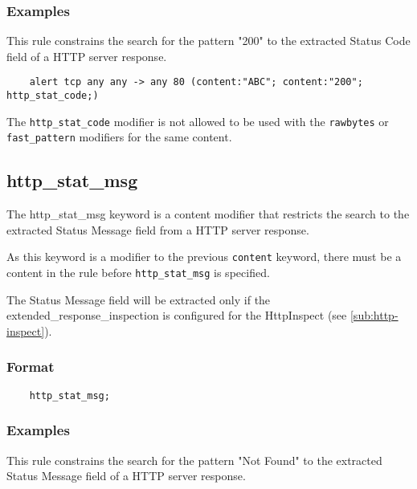 \documentclass[english]{report}
\newenvironment{note}{
\samepage
    \vspace{10pt}{\textsf{
        {\hspace{7pt}\Huge{$\triangle$\hspace{-12.5pt}{\Large{$^!$}}}}\hspace{5pt}
        {\Large{NOTE}}
    }
    }
   \begin{center}
    \par\vspace{-17pt}

    \begin{lrbox}{\savepar}
    \begin{minipage}[r]{6in}
}
{
    \end{minipage}
    \end{lrbox}
    \fbox{
        \usebox{
            \savepar
	}
    }
    \par\vskip10pt
    \end{center}
}
\newenvironment{note}{
        \begin{rawhtml}
        <p><table border="1"><tr><td><b>
        Note:&nbsp;&nbsp;</b>
        \end{rawhtml}
}{
        \begin{rawhtml}
        </b></td></tr></table></p>
        \end{rawhtml}
}
\begin{document}
\subsubsection{Examples}

This rule constrains the search for the pattern "200" to the extracted Status Code field 
of a HTTP server response.

\begin{verbatim}
    alert tcp any any -> any 80 (content:"ABC"; content:"200"; http_stat_code;)
\end{verbatim}

\begin{note}

The \texttt{http\_stat\_code} modifier is not allowed to be used with the
\texttt{rawbytes} or \texttt{fast\_pattern} modifiers for the same content.

\end{note}

\subsection{http\_stat\_msg}
\label{sub:HttpStatMsg}

The http\_stat\_msg keyword is a content modifier that restricts the search to the
extracted Status Message field from a HTTP server response.

As this keyword is a modifier to the previous \texttt{content} keyword, there must be
a content in the rule before \texttt{http\_stat\_msg} is specified.

The Status Message field will be extracted only if the extended\_response\_inspection is
configured for the HttpInspect (see \ref{sub:http-inspect}).

\subsubsection{Format}

\begin{verbatim}
    http_stat_msg;
\end{verbatim}

\subsubsection{Examples}

This rule constrains the search for the pattern "Not Found" to the extracted Status 
Message field of a HTTP server response.
\end{document}
